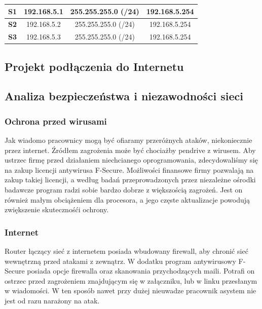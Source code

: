 \documentclass{article}
\begin{document}
\begin{table}[H]
\begin{tabular}{cccc}
		\multicolumn{1}{|c|}{\textbf{S1}}                    & \multicolumn{1}{c|}{192.168.5.1}                  & \multicolumn{1}{c|}{255.255.255.0 (/24)}     & \multicolumn{1}{c|}{192.168.5.254}               \\ \hline
		\multicolumn{1}{|c|}{\textbf{S2}}                    & \multicolumn{1}{c|}{192.168.5.2}                  & \multicolumn{1}{c|}{255.255.255.0 (/24)}     & \multicolumn{1}{c|}{192.168.5.254}               \\ \hline
		\multicolumn{1}{|c|}{\textbf{S3}}                    & \multicolumn{1}{c|}{192.168.5.3}             \textsl{}     & \multicolumn{1}{c|}{255.255.255.0 (/24)}     & \multicolumn{1}{c|}{192.168.5.254}               \\ \hline
	\end{tabular}
\end{table}

\newpage
\subsection{Projekt podłączenia do Internetu}

\newpage
\subsection{Analiza bezpieczeństwa i niezawodności sieci}
\subsubsection{Ochrona przed wirusami}
\par Jak wiadomo pracownicy mogą być ofiaramy przeróżnych ataków, niekoniecznie przez internet. Źródłem zagrożenia może być chociażby pendrive z wirusem. Aby ustrzec
firmę przed działaniem niechcianego oprogramowania, zdecydowaliśmy się na zakup licencji antywirusa F-Secure. Możliwości finansowe firmy pozwalają na zakup takiej licencji, 
a według badań przeprowadzonych przez niezależne ośrodki badawcze program radzi sobie bardzo dobrze z większością zagrożeń. Jest on również małym obciążeniem dla procesora,
a jego częste aktualizacje powodują zwiększenie skutecznośći ochrony.
\subsubsection{Internet}
\par Router łączący sieć z internetem posiada wbudowany firewall, aby chronić sieć wewnętrzną przed atakami z zewnątrz. W dodatku program antywirusowy F-Secure posiada opcje firewalla oraz skanowania przychodzących maili. Potrafi on ostrzec przed zagrożeniem znajdującym się w załączniku, lub w linku przesłanym w wiadomości. W ten sposób nawet przy dużej nieuwadze pracownik asystem nie jest od razu narażony na atak.
\end{document}
